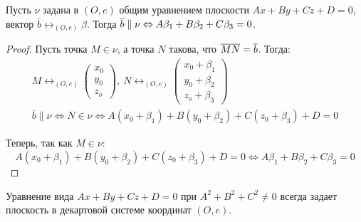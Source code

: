 \begin{proposition}
	Пусть $\nu$ задана в $(O, e)$ общим уравнением плоскости $Ax+By+Cz+D=0$, вектор $\overline{b} \leftrightarrow_{(O, e)} \beta$. Тогда $\overline{b} \hm{\parallel} \nu \Leftrightarrow A\beta_1 + B\beta_2 + C\beta_3 = 0$.
\end{proposition}

\begin{proof}
	Пусть точка $M \in \nu$, а точка $N$ такова, что $\overline{MN} \hm{=} \overline{b}$. Тогда:
	\begin{gather*}
	M \leftrightarrow_{(O, e)}
	\begin{pmatrix}
	x_0\\y_0\\z_o
	\end{pmatrix},~
	N \leftrightarrow_{(O, e)}
	\begin{pmatrix}
	x_0 + \beta_1\\y_0 + \beta_2\\z_o+\beta_3
	\end{pmatrix}\\
	\overline{b} \parallel \nu \Leftrightarrow N \in \nu \Leftrightarrow A(x_0 + \beta_1) + B(y_0 + \beta_2) + C(z_0 + \beta_3) + D = 0
	\end{gather*}
	
	Теперь, так как $M \in \nu$:
	\[A(x_0 + \beta_1) + B(y_0 + \beta_2) + C(z_0 + \beta_3) + D = 0 \Leftrightarrow A\beta_1 + B\beta_2 + C\beta_3= 0\]
\end{proof}

\begin{proposition}
	Уравнение вида $Ax+By+Cz+D=0$ при $A^2+B^2+C^2\ne0$ всегда задает плоскость в декартовой системе координат $(O, e)$.
\end{proposition}

